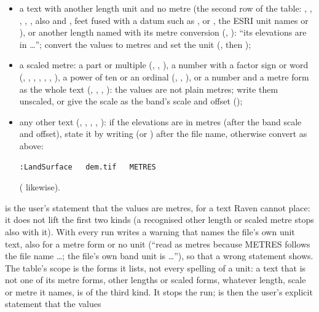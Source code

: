 \begin{itemize}
\item a text with another length unit and no metre (the second row of the table: , ,
, , , also  and , feet fused with a datum such as
,  or , the ESRI unit names  or ), or another length named with its metre conversion (, ): ``its elevations are
in \dots''; convert the values to metres and set the unit
(, then );
\item a scaled metre: a part or multiple (, , ), a number with a
factor sign or word (, , , , ,
, ), a power of ten or an ordinal (, , ), or a number
and a metre form as the whole text (, , , ): the values are not plain metres; write them unscaled, or give
the scale as the band's scale and offset ();
\item any other text (, , , , ): if the elevations are in metres (after the band scale and offset), state it by writing  (or
) after the file name, otherwise convert as above:
\begin{verbatim}
:LandSurface   dem.tif   METRES
\end{verbatim}
( likewise).
\end{itemize}
 is the user's statement that the values are metres, for a text Raven cannot place: it does not lift the
first two kinds (a recognised other length or scaled metre stops also with it). With  every run writes a
warning that names the file's own unit text, also for a metre form or no unit (``read as metres because METRES follows the
file name \dots; the file's own band unit is \dots''), so that a wrong statement shows.
The table's scope is the forms it lists, not every spelling of a unit: a text that is not one of its metre forms, other
lengths or scaled forms, whatever length, scale or metre it names, is of the third kind. It stops the run;  is then the user's explicit statement that the values
